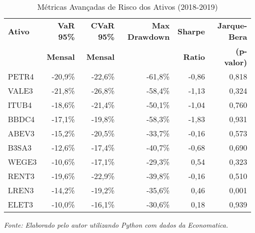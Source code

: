 \begin{table}[H]
\centering
\caption{Métricas Avançadas de Risco dos Ativos (2018-2019)}
\begin{tabular}{|l|r|r|r|r|r|}
\hline
\textbf{Ativo} & \textbf{VaR 95\%} & \textbf{CVaR 95\%} & \textbf{Max Drawdown} & \textbf{Sharpe} & \textbf{Jarque-Bera} \\
& \textbf{Mensal} & \textbf{Mensal} & & \textbf{Ratio} & \textbf{(p-valor)} \\
\hline
PETR4 & -20,9\% & -22,6\% & -61,8\% & -0,86 & 0,818 \\
\hline
VALE3 & -21,8\% & -26,8\% & -58,4\% & -1,13 & 0,324 \\
\hline
ITUB4 & -18,6\% & -21,4\% & -50,1\% & -1,04 & 0,760 \\
\hline
BBDC4 & -17,1\% & -19,8\% & -58,3\% & -1,83 & 0,931 \\
\hline
ABEV3 & -15,2\% & -20,5\% & -33,7\% & -0,16 & 0,573 \\
\hline
B3SA3 & -12,6\% & -17,4\% & -40,7\% & -0,68 & 0,690 \\
\hline
WEGE3 & -10,6\% & -17,1\% & -29,3\% & 0,54 & 0,323 \\
\hline
RENT3 & -19,6\% & -22,9\% & -39,8\% & -0,16 & 0,510 \\
\hline
LREN3 & -14,2\% & -19,2\% & -35,6\% & 0,46 & 0,001 \\
\hline
ELET3 & -10,0\% & -16,1\% & -30,6\% & 0,18 & 0,939 \\
\hline
\end{tabular}

\textit{Fonte: Elaborado pelo autor utilizando Python com dados da Economatica.}
\label{tab:risk_metrics}
\end{table}
